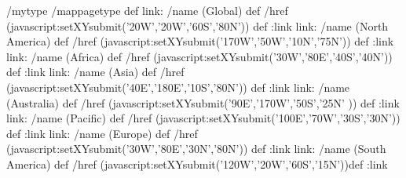\begin{ingrid}
/mytype /mappagetype def
link:
/name (Global) def
/href (javascript:setXYsubmit('20W','20W','60S','80N')) def
:link
link:
/name (North America) def
/href (javascript:setXYsubmit('170W','50W','10N','75N')) def
:link
link:
/name (Africa) def
/href (javascript:setXYsubmit('30W','80E','40S','40N')) def
:link
link:
/name (Asia) def
/href (javascript:setXYsubmit('40E','180E','10S','80N')) def
:link
link:
/name (Australia) def
/href (javascript:setXYsubmit('90E','170W','50S','25N' )) def
:link
link:
/name (Pacific) def
/href (javascript:setXYsubmit('100E','70W','30S','30N')) def
:link
link:
/name (Europe) def
/href (javascript:setXYsubmit('30W','80E','30N','80N')) def
:link
link:
/name (South America) def
/href (javascript:setXYsubmit('120W','20W','60S','15N'))def
:link
\end{ingrid}

